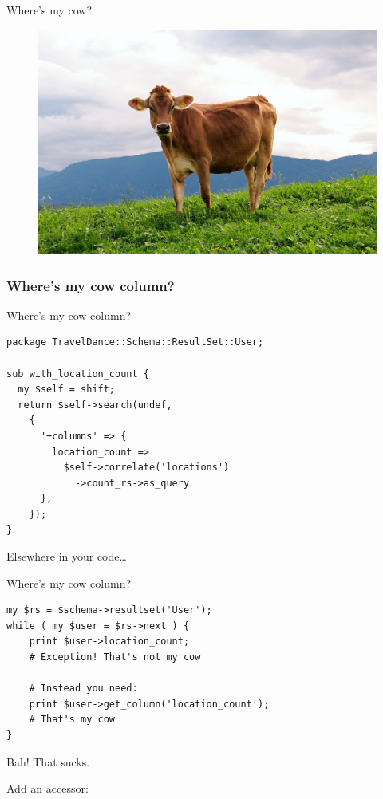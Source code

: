 \begin{frame}{Where's my cow?}
\begin{figure}[!ht]
\centering
\includegraphics[width=0.7\linewidth]{img/cow.jpg}
\end{figure}
\end{frame}

\subsubsection{Where's my cow column?}

\begin{frame}[fragile]{Where's my cow column?}
\begin{lstlisting}
package TravelDance::Schema::ResultSet::User;

sub with_location_count {
  my $self = shift;
  return $self->search(undef,
    {
      '+columns' => {
        location_count =>
          $self->correlate('locations')
            ->count_rs->as_query
      },
    });
}
\end{lstlisting}
\end{frame}

Elsewhere in your code…

\begin{frame}[fragile]{Where's my cow column?}
\begin{lstlisting}
my $rs = $schema->resultset('User');
while ( my $user = $rs->next ) {
    print $user->location_count; 
    # Exception! That's not my cow

    # Instead you need:
    print $user->get_column('location_count'); 
    # That's my cow
}
\end{lstlisting}
\end{frame}

Bah! That sucks.

Add an accessor:

